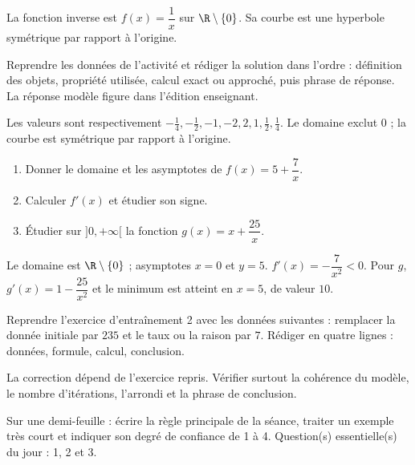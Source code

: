 \begin{summary}La fonction inverse est $f(x)=\dfrac1x$ sur $\R\setminus\{0\}$. Sa courbe est une hyperbole symétrique par rapport à l'origine.\end{summary}

\begin{example}
Reprendre les données de l'activité et rédiger la solution dans l'ordre : définition des objets, propriété utilisée, calcul exact ou approché, puis phrase de réponse. La réponse modèle figure dans l'édition enseignant.
\end{example}
\begin{solution}Les valeurs sont respectivement $-\frac14,-\frac12,-1,-2,2,1,\frac12,\frac14$. Le domaine exclut $0$ ; la courbe est symétrique par rapport à l'origine.\end{solution}

\begin{exercise}[essentiel]
\begin{enumerate}\item Donner le domaine et les asymptotes de $f(x)=5+\dfrac{7}x$.\item Calculer $f'(x)$ et étudier son signe.\item Étudier sur $]0,+\infty[$ la fonction $g(x)=x+\dfrac{25}x$.\end{enumerate}
\end{exercise}
\begin{solution}Le domaine est $\R\setminus\{0\}$ ; asymptotes $x=0$ et $y=5$. $f'(x)=-\dfrac{7}{x^2}<0$. Pour $g$, $g'(x)=1-\dfrac{25}{x^2}$ et le minimum est atteint en $x=5$, de valeur $10$.\end{solution}


\begin{homework}Reprendre l'exercice d'entraînement 2 avec les données suivantes : remplacer la donnée initiale par $235$ et le taux ou la raison par $7$. Rédiger en quatre lignes : données, formule, calcul, conclusion.\end{homework}
\begin{solution}La correction dépend de l'exercice repris. Vérifier surtout la cohérence du modèle, le nombre d'itérations, l'arrondi et la phrase de conclusion.\end{solution}

\begin{exitticket}[3 minutes]Sur une demi-feuille : écrire la règle principale de la séance, traiter un exemple très court et indiquer son degré de confiance de 1 à 4. Question(s) essentielle(s) du jour : 1, 2 et 3.\end{exitticket}

